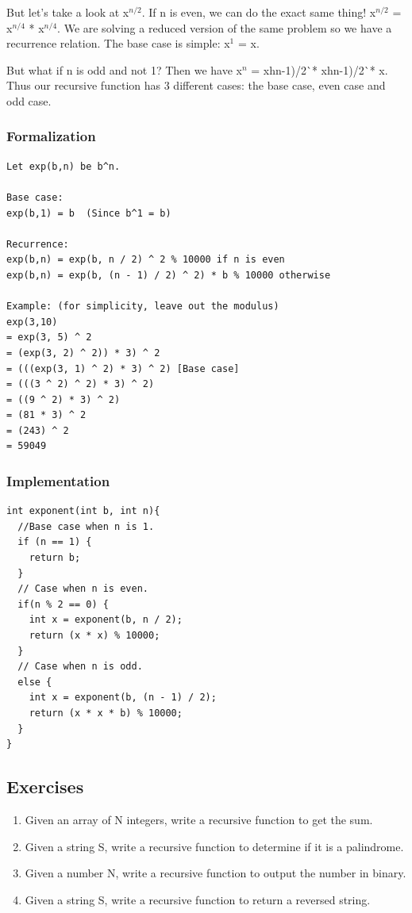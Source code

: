 \documentclass[11pt,oneside]{book}
\begin{document}
But let's take a look at x$^{n/2}$. If n is even, we can do the exact same thing! x$^{n/2}$ = x$^{n/4}$ * x$^{n/4}$. We are solving a reduced version of the same problem so we have a recurrence relation. The base case is simple: x$^{1}$ = x.

But what if n is odd and not 1? Then we have x$^{n}$ = x^^(n-1)/2^^ * x^^(n-1)/2^^ * x. Thus our recursive function has 3 different cases: the base case, even case and odd case.

\subsubsection{Formalization}

\begin{lstlisting}
Let exp(b,n) be b^n.

Base case:
exp(b,1) = b  (Since b^1 = b)

Recurrence:
exp(b,n) = exp(b, n / 2) ^ 2 % 10000 if n is even
exp(b,n) = exp(b, (n - 1) / 2) ^ 2) * b % 10000 otherwise

Example: (for simplicity, leave out the modulus)
exp(3,10)
= exp(3, 5) ^ 2
= (exp(3, 2) ^ 2)) * 3) ^ 2
= (((exp(3, 1) ^ 2) * 3) ^ 2) [Base case]
= (((3 ^ 2) ^ 2) * 3) ^ 2)
= ((9 ^ 2) * 3) ^ 2)
= (81 * 3) ^ 2
= (243) ^ 2
= 59049
\end{lstlisting}

\subsubsection{Implementation}

\begin{lstlisting}
int exponent(int b, int n){
  //Base case when n is 1.
  if (n == 1) {
    return b;
  }
  // Case when n is even.
  if(n % 2 == 0) {
    int x = exponent(b, n / 2);
    return (x * x) % 10000;
  }
  // Case when n is odd.
  else {
    int x = exponent(b, (n - 1) / 2);
    return (x * x * b) % 10000;
  }
}
\end{lstlisting}

\subsection{Exercises}

\begin{enumerate}
\item Given an array of N integers, write a recursive function to get the sum.
\item Given a string S, write a recursive function to determine if it is a palindrome.
\item Given a number N, write a recursive function to output the number in binary.
\item Given a string S, write a recursive function to return a reversed string.
\end{enumerate}
\end{document}

